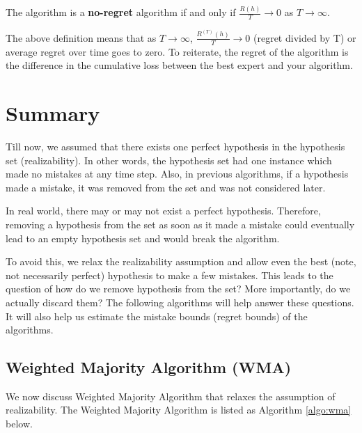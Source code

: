 \documentclass[11pt]{article}
\begin{document}
The algorithm is a \textbf{no-regret} algorithm if and only if $\frac{R(h)}{T}\rightarrow0$ as $T\rightarrow\infty$.

\normalfont
The above definition means that as $T\rightarrow\infty$, $\frac{R^{(T)}(h)}{T}\rightarrow0$ (regret divided by T) or average regret over time goes to zero. 
To reiterate, the regret of the algorithm is the difference in the cumulative loss between the best expert and your algorithm.

\section{Summary}
\normalfont
Till now, we assumed that there exists one perfect hypothesis in the hypothesis set (realizability). In other words, the hypothesis set had one instance which made no mistakes at any time step. Also, in previous algorithms, if a hypothesis made a mistake, it was removed from the set and was not considered later.

In real world, there may or may not exist a perfect hypothesis. Therefore, removing a hypothesis from the set as soon as it made a mistake could eventually lead to an empty hypothesis set and would break the algorithm.

To avoid this, we relax the realizability assumption and allow even the best (note, not necessarily perfect) hypothesis to make a few mistakes. This leads to the question of how do we remove hypothesis from the set? More importantly, do we actually discard them? The following algorithms will help answer these questions. It will also help us estimate the mistake bounds (regret bounds) of the algorithms.

\subsection{Weighted Majority Algorithm (WMA)}
\normalfont

We now discuss Weighted Majority Algorithm that relaxes the assumption of realizability.
The Weighted Majority Algorithm \cite{littlestone1989weighted} is listed as Algorithm \ref{algo:wma} below. 
\end{document}
